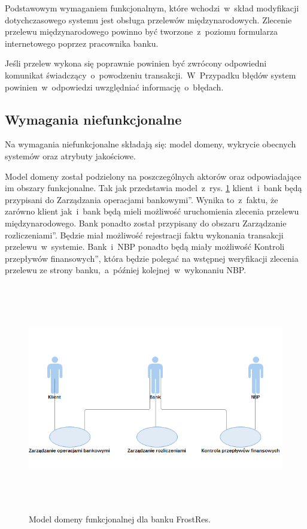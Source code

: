 Podstawowym wymaganiem funkcjonalnym, które wchodzi~w~skład modyfikacji dotychczasowego systemu jest obsługa przelewów międzynarodowych. Zlecenie przelewu międzynarodowego powinno być tworzone~z~poziomu formularza internetowego poprzez pracownika banku.

Jeśli przelew wykona się poprawnie powinien być zwrócony odpowiedni komunikat świadczący~o~powodzeniu transakcji.~W~Przypadku błędów system powinien~w~odpowiedzi uwzględniać informację~o~błędach.

\subsection*{Wymagania niefunkcjonalne}
Na wymagania niefunkcjonalne składają się: model domeny, wykrycie obecnych systemów oraz atrybuty jakościowe.

Model domeny został podzielony na poszczególnych aktorów oraz odpowiadające im obszary funkcjonalne. Tak jak przedstawia model~z~rys. \ref{model_domeny_funk} klient~i~bank będą przypisani do \quotedblbase Zarządzania operacjami bankowymi\textquotedblright. Wynika to~z~faktu, że zarówno klient jak~i~bank będą mieli możliwość uruchomienia zlecenia przelewu międzynarodowego. Bank ponadto został przypisany do obszaru \quotedblbase Zarządzanie rozliczeniami\textquotedblright. Będzie miał możliwość rejestracji faktu wykonania transakcji przelewu~w~systemie. Bank~i~NBP ponadto będą miały możliwość \quotedblbase Kontroli przepływów finansowych\textquotedblright, która będzie polegać na wstępnej weryfikacji zlecenia przelewu ze strony banku,~a~później kolejnej~w~wykonaniu NBP.

\begin{figure}[h!tbp]
\begin{centering}
\includegraphics[width=13cm, height=10cm]{img/model_domeny_funk.png}
\caption[Model domeny funkcjonalnej dla banku FrostRes]{Model domeny funkcjonalnej dla banku FrostRes.}\label{model_domeny_funk}
\end{centering}
\end{figure}

